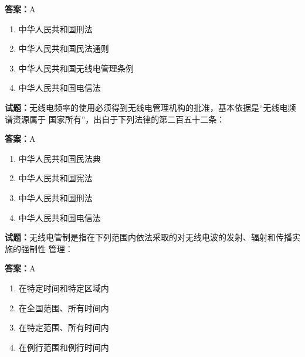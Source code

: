 \documentclass{ctexbook}
\begin{document}
\textbf{答案：}A 

\begin{enumerate}[leftmargin=3em]
  \item 中华人民共和国刑法 

  \item 中华人民共和国民法通则 

  \item 中华人民共和国无线电管理条例 

  \item 中华人民共和国电信法 

\end{enumerate}





\vspace{1em}

\textbf{试题：}无线电频率的使用必须得到无线电管理机构的批准，基本依据是“无线电频谱资源属于
国家所有”，出自于下列法律的第二百五十二条： 

\textbf{答案：}A 

\begin{enumerate}[leftmargin=3em]
  \item 中华人民共和国民法典 

  \item 中华人民共和国宪法 

  \item 中华人民共和国刑法 


  \item 中华人民共和国电信法 

\end{enumerate}





\vspace{1em}

\textbf{试题：}无线电管制是指在下列范围内依法采取的对无线电波的发射、辐射和传播实施的强制性
管理： 

\textbf{答案：}A 

\begin{enumerate}[leftmargin=3em]
  \item 在特定时间和特定区域内 

  \item 在全国范围、所有时间内 

  \item 在特定范围、所有时间内 

  \item 在例行范围和例行时间内 

\end{enumerate}
\end{document}
